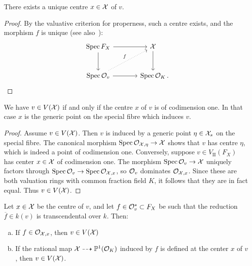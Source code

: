 \begin{lemma}
    There exists a unique centre $x \in \mathcal X$ of $v$.
\end{lemma}

\begin{proof}
    By the valuative criterion for properness, such a centre exists, and the morphism $f$ is unique
    (see also~\cite[\href{https://stacks.math.columbia.edu/tag/01J5}{Section 01J5, Lemma 01J6}]{Stacks}):
    \[
        \begin{tikzcd}[column sep=large, row sep=large]
            \Spec F_X \arrow[d] \arrow[r]                 & \X \arrow[d] \\
            \Spec \OO_v \arrow[r] \arrow[ru, "f", dotted] & \Spec \OK  \cdpunkt
        \end{tikzcd}
    \]
\end{proof}

\begin{lemma}\label{lem:codim1}
    We have $v \in V(\mathcal X)$ if and only if the centre $x$ of $v$ is of codimension one.
    In that case $x$ is the generic point on the special fibre which induces $v$.
\end{lemma}

\begin{proof}
    Assume $v \in V(\mathcal X)$.
    Then $v$ is induced by a generic point $\eta \in \mathcal X_s$ on the special fibre.
    The canonical morphism $\operatorname{Spec} \mathcal{O}_{\mathcal X, \eta} \to \mathcal X$ shows that $v$ has centre $\eta$,  which is indeed a point of codimension one.
    Conversely, suppose $v \in V_\textrm{II}(F_X)$ has center $x \in \mathcal X$ of codimension one.
    The morphism $\operatorname{Spec} \mathcal{O}_v \to \mathcal X$ uniquely factors through $\operatorname{Spec} \mathcal{O}_v \to \operatorname{Spec} \mathcal{O}_{\mathcal X, x}$, so $\mathcal{O}_v$ dominates $\mathcal{O}_{\mathcal X, x}$.
    Since these are both valuation rings with common fraction field $K$, it follows that they are in fact equal.
    Thus \(v \in V(\mathcal X)\).
\end{proof}

\begin{lemma} \label{lem:condition_induced}
    Let $x \in \mathcal X$ be the centre of $v$, and let $f \in \mathcal{O}_v^* \subset F_X$ be such that the reduction $\overline{f} \in k(v)$ is transcendental over $k$.
    Then:
    \begin{enumerate}[(a)]
    \item If $f \in \mathcal{O}_{\mathcal X,x}$, then $v \in V(\mathcal X)$ \label{lem:condition_induced_i}
    \item If the rational map $\mathcal X \dashrightarrow \mathbb P^1(\mathcal O_K )$ induced by $f$ is defined at the center $x$ of $v$,
    then $v \in V(\mathcal X)$. \label{lem:condition_induced_ii}
    \end{enumerate}
\end{lemma}

